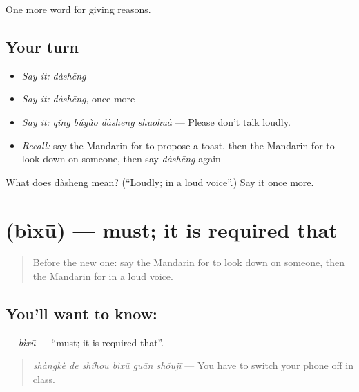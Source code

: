 \begin{grammarlens}[title={What you've built}]
One more word for giving reasons.
\end{grammarlens}

\subsection*{Your turn}
\begin{itemize}
\raggedright
  \item \emph{Say it:} \emph{dàshēng}
  \item \emph{Say it:} \emph{dàshēng}, once more
  \item \emph{Say it:} \emph{qǐng búyào dàshēng shuōhuà} — Please don't talk loudly.
  \item \emph{Recall:} say the Mandarin for to propose a toast, then the Mandarin for to look down on someone, then say \emph{dàshēng} again
\end{itemize}

\begin{tcolorbox}[breakable,colback=teal!4,colframe=teal!35!black,title={Before you move on}]
What does dàshēng mean? (\textquotedblleft{}Loudly; in a loud voice\textquotedblright{}.) Say it once more.
\end{tcolorbox}
\section[\texorpdfstring{\zh{必须} (bìxū)}{必须 (bìxū)}]{ (bìxū) — must; it is required that}

\label{lesson:ZH-C362-bixu}



\begin{quote}
Before the new one: say the Mandarin for to look down on someone, then the Mandarin for in a loud voice.
\end{quote}

\subsection*{You'll want to know: }
\textbf{} — \emph{bìxū} — \textquotedblleft{}must; it is required that\textquotedblright{}.

\begin{quote}
\textbf{} \emph{shàngkè de shíhou bìxū guān shǒujī} — You have to switch your phone off in class.
\end{quote}

